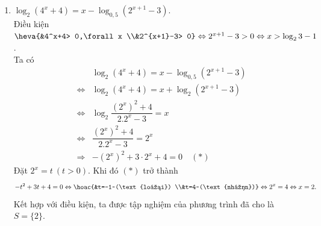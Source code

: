 \begin{ex}
{\begin{enumerate}
			Điều kiện $9-2^x  > 0\Leftrightarrow 2^x < 9\Leftrightarrow x < \log_2 9$.\\
			Ta có 
			 \allowdisplaybreaks
			\begin{eqnarray*}
				 &&\log_2\left(9-2^x\right)=3-x
				\\ 
				&  \Leftrightarrow& 9-2^x=2^{3-x}
				\\ 
				&\Leftrightarrow&  9-2^x=2^3\cdot \dfrac{1}{2^x}
				 \\
				&  \Leftrightarrow& 9\cdot 2^x-(2^x)^2-8=0\quad (*)
			\end{eqnarray*}
			Đặt $2^x=t~(t >  0)$. Khi đó $(*)$ trở thành \[-t^2+9t-8=0\Leftrightarrow
			 \hoac{&t=8~(\text{nhận }) \\&t=1~(\text{nhận})}
			 \Leftrightarrow \hoac{&2^x=1\Leftrightarrow x=0\\ &2^x=8\Leftrightarrow x=3}\]
			Kết hợp với điều kiện, ta được tập nghiệm của phương trình đã cho là $S=\{0; 3\}$. 
			\item  $\log_2\left(4^x+4\right)=x-\log _{0,5}\left(2^{x+1}-3\right)$.\\
			 Điều kiện $\heva{&4^x+4> 0,\forall x \\&2^{x+1}-3> 0} \Leftrightarrow 2^{x+1}-3> 0\Leftrightarrow x > \log_2 3-1$.\\
			Ta có 
			\allowdisplaybreaks 
			\begin{eqnarray*}
				&&\log_2\left(4^x+4\right)=x-\log _{0,5}\left(2^{x+1}-3\right) 
				\\ 
				&\Leftrightarrow&  \log_2\left(4^x+4\right)=x+\log_2\left(2^{x+1}-3\right)
				 \\
				&\Leftrightarrow& \log_2 \dfrac{(2^x)^2+4}{2.2^x-3}=x 
				 \\
				&\Leftrightarrow&  \dfrac{(2^x)^2+4}{2.2^x-3}=2^x
				\\ 
				 &\Rightarrow&-(2^x)^2+3\cdot 2^x+4=0\quad(*)
			\end{eqnarray*}
			Đặt $2^x=t~(t  > 0)$. Khi đó $(*)$ trở thành \[-t^2+3t+4=0\Leftrightarrow
			\hoac{&t=-1~(\text{loại})  \\&t=4~(\text{nhận})}
			\Leftrightarrow  2^x=4\Leftrightarrow x=2.\]
			Kết hợp với điều kiện, ta được  tập nghiệm của phương trình đã cho là $S=\{2\}$.
		\end{enumerate}
	 }
\end{ex}

